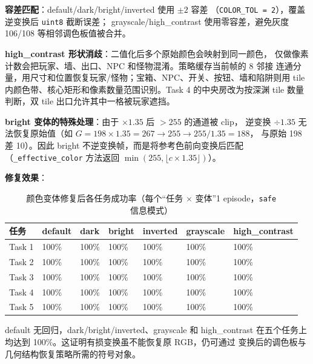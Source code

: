 \documentclass[12pt,a4paper]{ctexart}
\begin{document}
\textbf{容差匹配}：default/dark/bright/inverted 使用 $\pm 2$ 容差
（\texttt{COLOR\_TOL = 2}），覆盖逆变换后 \texttt{uint8} 截断误差；
grayscale/high\_contrast 使用零容差，避免灰度 106/108 等相邻调色板值被合并。

\textbf{high\_contrast 形状消歧}：二值化后多个原始颜色会映射到同一颜色，
仅做像素计数会把玩家、墙、出口、NPC 和怪物混淆。策略缓存当前帧的 8 邻接
连通分量，用尺寸和位置恢复玩家/怪物；宝箱、NPC、开关、按钮、墙和陷阱则用
tile 内颜色带、核心矩形和像素数量范围识别。Task 4 的中央房改为按深渊 tile
数量判断，双 tile 出口允许其中一格被玩家遮挡。

\textbf{bright 变体的特殊处理}：由于 $\times 1.35$ 后 $> 255$ 的通道被 clip，
逆变换 $\div 1.35$ 无法恢复原始值（如 $G = 198 \times 1.35 = 267 \to 255 \to 255 / 1.35 = 188$，
与原始 198 差 10）。因此 bright 不逆变换帧，而是将参考色前向变换后匹配
（\texttt{\_effective\_color} 方法返回 $\min(255, \lfloor c \times 1.35 \rfloor)$）。

\textbf{修复效果}：

\begin{table}[H]
\centering
\begin{tabular}{p{}p{}p{}p{}p{}p{}p{}}
\toprule
任务 & default & dark & bright & inverted & grayscale & high\_contrast \\
\midrule
Task 1 & 100\% & 100\% & 100\% & 100\% & 100\% & 100\% \\
Task 2 & 100\% & 100\% & 100\% & 100\% & 100\% & 100\% \\
Task 3 & 100\% & 100\% & 100\% & 100\% & 100\% & 100\% \\
Task 4 & 100\% & 100\% & 100\% & 100\% & 100\% & 100\% \\
Task 5 & 100\% & 100\% & 100\% & 100\% & 100\% & 100\% \\
\bottomrule
\end{tabular}
\caption{颜色变体修复后各任务成功率（每个“任务 $\times$ 变体”1 episode，\texttt{safe} 信息模式）}
\end{table}

default 无回归，dark/bright/inverted、grayscale 和 high\_contrast
在五个任务上均达到 100\%。这证明有损变换虽不能恢复原 RGB，仍可通过
变换后的调色板与几何结构恢复策略所需的符号对象。
\end{document}
